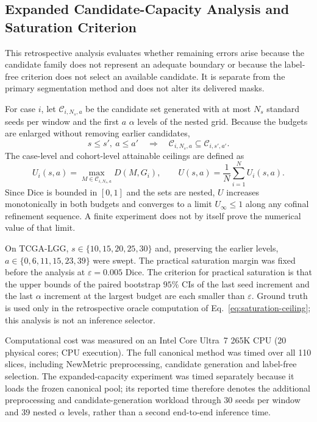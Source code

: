 \documentclass[11pt,a4paper]{article}
\begin{document}
\subsection{Expanded Candidate-Capacity Analysis and Saturation Criterion}\label{sec:saturation-method}

This retrospective analysis evaluates whether remaining errors arise because the
candidate family does not represent an adequate boundary or because the
label-free criterion does not select an available candidate. It is separate from
the primary segmentation method and does not alter its delivered masks.

For case $i$, let $\mathcal C_{i,N_s,a}$ be the candidate set generated with at
most $N_s$ standard seeds per window and the first $a$ $\alpha$ levels of the
nested grid. Because the budgets are enlarged without removing earlier
candidates,
\begin{equation}
s\le s',\ a\le a'\quad\Longrightarrow\quad
\mathcal C_{i,N_s,a}\subseteq\mathcal C_{i,s',a'}.
\end{equation}
The case-level and cohort-level attainable ceilings are defined as
\begin{equation}
U_i(s,a)=\max_{M\in\mathcal C_{i,N_s,a}}D(M,G_i),\qquad
U(s,a)=\frac1N\sum_{i=1}^{N}U_i(s,a).
\label{eq:saturation-ceiling}
\end{equation}
Since Dice is bounded in $[0,1]$ and the sets are nested, $U$ increases
monotonically in both budgets and converges to a limit $U_\infty\le1$ along any
cofinal refinement sequence. A finite experiment does not by itself prove the
numerical value of that limit.

On TCGA-LGG, $s\in\{10,15,20,25,30\}$ and, preserving the earlier levels,
$a\in\{0,6,11,15,23,39\}$ were swept. The practical saturation margin was fixed
before the analysis at $\varepsilon=0.005$ Dice. The criterion for practical
saturation is that the upper bounds of the paired bootstrap $95\%$ CIs of the last
seed increment and the last $\alpha$ increment at the largest budget are each
smaller than $\varepsilon$. Ground truth is used only in the retrospective oracle
computation of Eq.~\eqref{eq:saturation-ceiling}; this analysis is not an
inference selector.

Computational cost was measured on an Intel Core Ultra~7 265K CPU (20 physical
cores; CPU execution). The full canonical method was timed over all 110 slices,
including NewMetric preprocessing, candidate generation and label-free selection.
The expanded-capacity experiment was timed separately because it loads the frozen
canonical pool; its reported time therefore denotes the additional preprocessing
and candidate-generation workload through 30 seeds per window and 39 nested
$\alpha$ levels, rather than a second end-to-end inference time.
\end{document}
